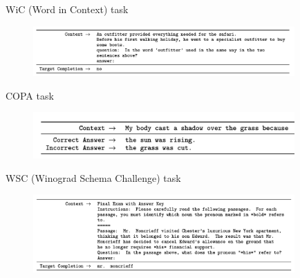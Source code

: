 
\begin{vbframe}{WiC (Word in Context) task}

\vfill

	\begin{figure}
		\centering
		\includegraphics[width=10cm]{figure/wicperf.png}
	\end{figure}

\vfill

\end{vbframe}




\begin{vbframe}{COPA task}

\vfill

	\begin{figure}
		\centering
		\includegraphics[width=10cm]{figure/copaperf.png}
	\end{figure}

\vfill

\end{vbframe}




\begin{vbframe}{WSC (Winograd Schema Challenge) task}

\vfill

	\begin{figure}
		\centering
		\includegraphics[width=10cm]{figure/wscformat.png}
	\end{figure}

\vfill

\end{vbframe}



